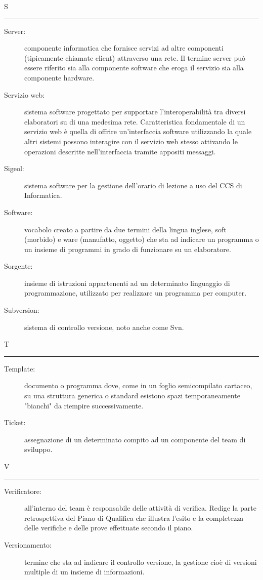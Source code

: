 \documentclass[11pt,a4paper]{article}
\begin{document}
\bigskip
\Huge S \bigskip
\hrule
\smallskip
\normalsize
\begin{description}
	\item[Server:] componente informatica che fornisce servizi ad altre componenti (tipicamente chiamate client) attraverso una rete. Il termine server può essere riferito sia alla componente software che eroga il servizio sia alla componente hardware.
	\item[Servizio web:] sistema software progettato per supportare l'interoperabilità tra diversi elaboratori su di una medesima rete. Caratteristica fondamentale di un servizio web è quella di offrire un'interfaccia software utilizzando la quale altri sistemi possono interagire con il servizio web stesso attivando le operazioni descritte nell'interfaccia tramite appositi messaggi.
	\item[Sigeol:] sistema software per la gestione dell'orario di lezione a uso del CCS di Informatica.
	\item[Software:] vocabolo creato a partire da due termini della lingua inglese, soft (morbido) e ware (manufatto, oggetto) che sta ad indicare un programma o un insieme di programmi in grado di funzionare su un elaboratore.
	\item[Sorgente:] insieme di istruzioni appartenenti ad un determinato linguaggio di programmazione, utilizzato per realizzare un programma per computer.
	\item[Subversion:] sistema di controllo versione, noto anche come Svn.
\end{description}
\bigskip
\Huge T \bigskip
\hrule
\smallskip
\normalsize
\begin{description}
	\item[Template:] documento o programma dove, come in un foglio semicompilato cartaceo, su una struttura generica o standard esistono spazi temporaneamente "bianchi" da riempire successivamente.
	\item[Ticket:] assegnazione di un determinato compito ad un componente del team di sviluppo.
\end{description}
\bigskip
\Huge V \bigskip
\hrule
\smallskip
\normalsize
\begin{description}
	\item[Verificatore:] all'interno del team è responsabile delle attività di verifica. Redige la parte retrospettiva del Piano di Qualifica che illustra l'esito e la completezza delle verifiche e delle prove effettuate secondo il piano.
	\item[Versionamento:] termine che sta ad indicare il controllo versione, la gestione cioè di versioni multiple di un insieme di informazioni.
\end{description}
\end{document}
